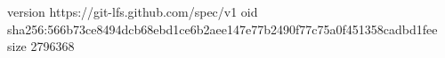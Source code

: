 version https://git-lfs.github.com/spec/v1
oid sha256:566b73ce8494dcb68ebd1ce6b2aee147e77b2490f77c75a0f451358cadbd1fee
size 2796368
